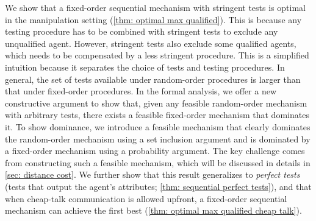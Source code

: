 We show that a fixed-order sequential mechanism with stringent tests is optimal in the manipulation setting (\cref{thm: optimal max qualified}).
This is because any testing procedure has to be combined with stringent tests to exclude any unqualified agent.
However, stringent tests also exclude some qualified agents, which needs to be compensated by a less stringent procedure.
This is a simplified intuition because it separates the choice of tests and testing procedures.
In general, the set of tests available under random-order procedures is larger than that under fixed-order procedures.  
 In the formal analysis, we offer a new constructive argument to show that, given any feasible random-order mechanism with arbitrary tests, there exists a feasible fixed-order mechanism that dominates it.
 To show dominance, we introduce a feasible mechanism that clearly dominates the random-order mechanism using a set inclusion argument and is dominated by a fixed-order mechanism using a probability argument.
 The key challenge comes from constructing such a feasible mechanism, which will be discussed in details in \cref{sec: distance cost}.
  We further show that this result generalizes to  \emph{perfect tests} (tests that output the agent's attributes; \cref{thm: sequential perfect tests}), and that when cheap-talk communication is allowed upfront, a fixed-order sequential mechanism can achieve the first best (\cref{thm: optimal max qualified cheap talk}).



